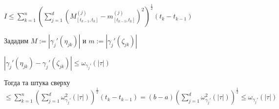 \documentclass[12pt]{article}
\begin{document}
$I \leq \sum\limits_{k = 1}^n (\sum\limits_{j = 1}^d (M^{(j)}_{[t_{k - 1}, t_k]} - m^{(j)}_{[t_{k - 1}, t_k]})^2)^\frac{1}{2}(t_k - t_{k - 1})$

Зададим $M := |\gamma_j'(\eta_{jk})|$ и $m := |\gamma_j'(\zeta_{jk})|$

$|\gamma_j'(\eta_{jk}) - \gamma_j'(\zeta_{jk})| \leq \omega_{\gamma_j'}(|\tau|)$

Тогда та штука сверху $\leq \sum\limits_{k = 1}^n(\sum\limits_{j = 1}^d \omega^2_{\gamma_j'}(|\tau|))^\frac{1}{2}(t_k - t_{k - 1}) = (b - a) (\sum\limits_{j = 1}^d \omega^2_{\gamma_j'}(|\tau|))^\frac{1}{2} \leq \omega_{\gamma_j'}(|\tau|)$
\end{document}
